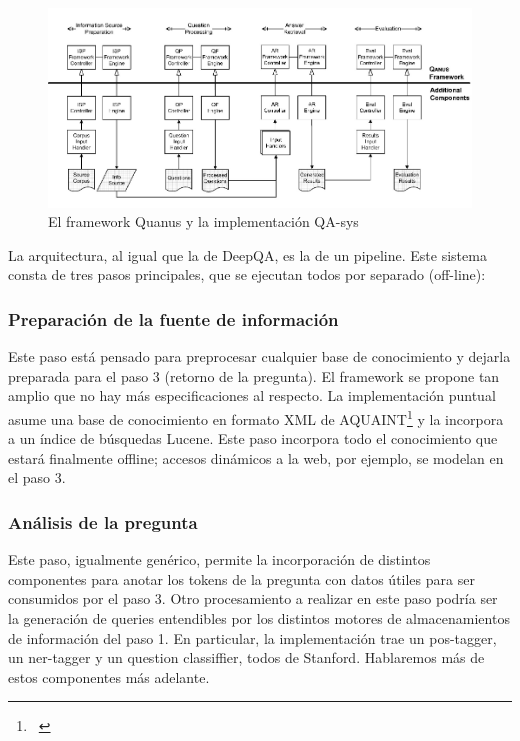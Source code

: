 \begin{figure}
  \centering
    \includegraphics{graficos/Quanus}
  \caption{El framework Quanus y la implementación QA-sys}
  \label{fig:Quanus}
\end{figure}


La arquitectura, al igual que la de DeepQA, es la de un pipeline. Este
sistema consta de tres pasos principales, que se ejecutan todos por
separado (off-line): 


\bigskip

\subsubsection*{Preparación de la fuente de información}
Este paso está pensado para preprocesar cualquier base de conocimiento
y dejarla preparada para el paso 3 (retorno de la pregunta). El
framework se propone tan amplio que no hay más especificaciones al
respecto. La implementación puntual asume una base de conocimiento en
formato XML de AQUAINT\footnote{\ } y la incorpora a un índice de
búsquedas Lucene. Este paso incorpora todo el conocimiento que
estará finalmente offline; accesos dinámicos a la web, por ejemplo,
se modelan en el paso 3.


\bigskip

\subsubsection*{Análisis de la pregunta}
Este paso, igualmente genérico, permite la incorporación de
distintos componentes para anotar los tokens de la pregunta con datos
útiles para ser consumidos por el paso 3. Otro procesamiento a
realizar en este paso podría ser la generación de queries
entendibles por los distintos motores de almacenamientos de
información del paso 1. En particular, la implementación trae un
pos-tagger, un ner-tagger y un question classiffier, todos de Stanford.
Hablaremos más de estos componentes más adelante. 



